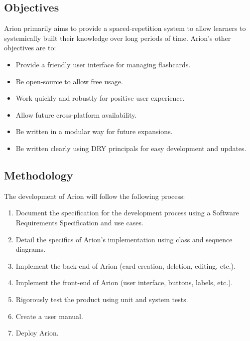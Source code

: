 \documentclass{scrreprt}
\begin{document}
\subsection{Objectives}
Arion primarily aims to provide a spaced-repetition system to allow learners to 
systemically built their knowledge over long periods of time. Arion's other objectives are to:
\begin{itemize}
    \item Provide a friendly user interface for managing flashcards.
    \item Be open-source to allow free usage.
    \item Work quickly and robustly for positive user experience.
    \item Allow future cross-platform availability.
    \item Be written in a modular way for future expansions.
    \item Be written clearly using DRY principals for easy development and updates.
\end{itemize}

\subsection{Methodology}
The development of Arion will follow the following process:
\begin{enumerate}[1.]
    \item Document the specification for the development process using a Software Requirements Specification and use cases.
    \item Detail the specifics of Arion's implementation using class and sequence diagrams.
    \item Implement the back-end of Arion (card creation, deletion, editing, etc.).
    \item Implement the front-end of Arion (user interface, buttons, labels, etc.).
    \item Rigorously test the product using unit and system tests.
    \item Create a user manual.
    \item Deploy Arion.
\end{enumerate}
\end{document}
